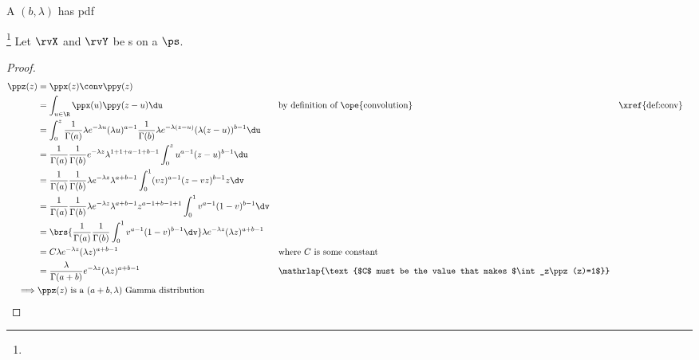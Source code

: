 \begin{definition}
A  $(b,\lambda)$ has pdf
\end{definition}

\begin{theorem}
\label{thm:Gamma_X+Y}
\footnote{
  }
Let $\rvX$ and $\rvY$ be s on a  $\ps$.
\end{theorem}
\begin{proof}
\begin{align*}
  \ppz(z)
    &= \ppx(z)\conv\ppy(z)
  \\&= \int_{u\in\R} \ppx(u)\ppy(z-u) \du
    && \text{by definition of \ope{convolution}}
    && \text{\xref{def:conv}}
  \\&= \int_0^z
       \frac{1}{\Gamma(a)}\lambda e^{-\lambda u}(\lambda u)^{a-1}
       \frac{1}{\Gamma(b)}\lambda e^{-\lambda(z-u)}(\lambda(z-u))^{b-1}
       \du
  \\&= \frac{1}{\Gamma(a)}\frac{1}{\Gamma(b)}e^{-\lambda z}\lambda^{1+1+a-1+b-1}
       \int_0^z  u^{a-1}(z-u)^{b-1}  \du
  \\&= \frac{1}{\Gamma(a)}\frac{1}{\Gamma(b)}\lambda e^{-\lambda z}\lambda^{a+b-1}
       \int_0^1  (vz)^{a-1}(z-vz)^{b-1}  z\dv
  \\&= \frac{1}{\Gamma(a)}\frac{1}{\Gamma(b)}\lambda e^{-\lambda z}\lambda^{a+b-1}
       z^{a-1+b-1+1}
       \int_0^1  v^{a-1}(1-v)^{b-1}  \dv
  \\&= \brs{
       \frac{1}{\Gamma(a)}\frac{1}{\Gamma(b)}
       \int_0^1  v^{a-1}(1-v)^{b-1}  \dv
       }
       \lambda e^{-\lambda z}(\lambda z)^{a+b-1}
  \\&= C\lambda e^{-\lambda z}(\lambda z)^{a+b-1}
    && \text{where $C$ is some constant}
  \\&= \frac{\lambda}{\Gamma(a+b)} e^{-\lambda z}(\lambda z)^{a+b-1}
    &&\mathrlap{\text{$C$ must be the value that makes $\int_z\ppz(z)=1$}}
\\\implies & \text{$\ppz(z)$ is a $(a+b,\lambda)$ Gamma distribution}
\end{align*}
\end{proof}

